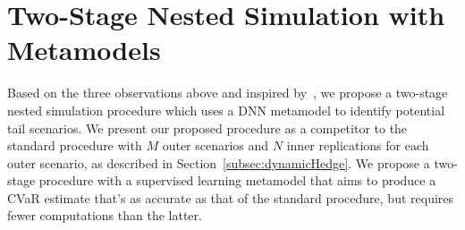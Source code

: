 \section{Two-Stage Nested Simulation with Metamodels} \label{sec2:metamodel2Stage}

Based on the three observations above and inspired by~\cite{dang2020efficient}, we propose a two-stage nested simulation procedure which uses a DNN metamodel to identify potential tail scenarios.
We present our proposed procedure as a competitor to the standard procedure with $M$ outer scenarios and $N$ inner replications for each outer scenario, as described in Section~\ref{subsec:dynamicHedge}.
We propose a two-stage procedure with a supervised learning metamodel that aims to produce a CVaR estimate that's as accurate as that of the standard procedure, but requires fewer computations than the latter.


